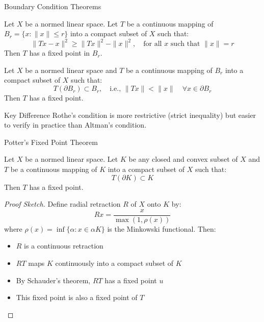 \documentclass[aspectratio=169,10pt]{beamer}
\begin{document}
\begin{frame}[allowframebreaks]{Boundary Condition Theorems}
    \begin{theorem}
        Let $X$ be a normed linear space. Let $T$ be a continuous mapping of $B_r = \{x: \|x\| \le r\}$ into a compact subset of $X$ such that:
        \[
        \|Tx - x\|^2 \ge \|Tx\|^2 - \|x\|^2, \quad \text{for all } x \text{ such that } \|x\| = r
        \]
        Then $T$ has a fixed point in $B_r$.
    \end{theorem}

    \begin{theorem}
        Let $X$ be a normed linear space and $T$ be a continuous mapping of $B_r$ into a compact subset of $X$ such that:
        \[
        T(\partial B_r) \subset B_r, \quad \text{i.e., } \|Tx\| < \|x\| \quad \forall x \in \partial B_r
        \]
        Then $T$ has a fixed point.
    \end{theorem}

    \begin{block}{Key Difference}
        Rothe's condition is more restrictive (strict inequality) but easier to verify in practice than Altman's condition.
    \end{block}
\end{frame}

\begin{frame}[allowframebreaks]{Potter's Fixed Point Theorem}
    \begin{theorem}
        Let $X$ be a normed linear space. Let $K$ be any closed and convex subset of $X$ and $T$ be a continuous mapping of $K$ into a compact subset of $X$ such that:
        \[
        T(\partial K) \subset K
        \]
        Then $T$ has a fixed point.
    \end{theorem}

    \begin{proof}[Proof Sketch]
        Define radial retraction $R$ of $X$ onto $K$ by:
        \[
        Rx = \frac{x}{\max(1, \rho(x))}
        \]
        where $\rho(x) = \inf\{\alpha: x \in \alpha K\}$ is the Minkowski functional. Then:
        \begin{itemize}
            \item $R$ is a continuous retraction
            \item $RT$ maps $K$ continuously into a compact subset of $K$
            \item By Schauder's theorem, $RT$ has a fixed point $u$
            \item This fixed point is also a fixed point of $T$
        \end{itemize}
    \end{proof}
\end{frame}
\end{document}
